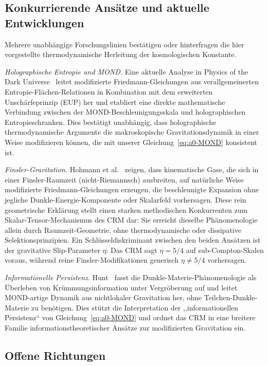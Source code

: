 \documentclass[12pt,a4paper]{article}
\theoremstyle{definition}
\theoremstyle{plain}
\theoremstyle{remark}
\begin{document}
\subsection{Konkurrierende Ans\"atze und aktuelle Entwicklungen}

Mehrere unabh\"angige Forschungslinien best\"atigen oder hinterfragen die
hier vorgestellte thermodynamische Herleitung der kosmologischen Konstante.

\emph{Holographische Entropie und MOND.}\; Eine aktuelle Analyse in Physics
of the Dark Universe~\cite{MONDEntropy2025} leitet modifizierte
Friedmann-Gleichungen aus verallgemeinerten Entropie-Fl\"achen-Relationen
in Kombination mit dem erweiterten Unsch\"arfeprinzip (EUP) her und
etabliert eine direkte mathematische Verbindung zwischen der
MOND-Beschleunigungsskala und holographischen Entropieschranken. Dies
best\"atigt unabh\"angig, dass holographische thermodynamische Argumente
die makroskopische Gravitationsdynamik in einer Weise modifizieren
k\"onnen, die mit unserer Gleichung~\eqref{eq:a0-MOND} konsistent ist.

\emph{Finsler-Gravitation.}\; Hohmann et al.~\cite{FinslerJCAP2025} zeigen,
dass kinematische Gase, die sich in einer Finsler-Raumzeit (nicht-Riemannsch)
ausbreiten, auf nat\"urliche Weise modifizierte Friedmann-Gleichungen
erzeugen, die beschleunigte Expansion ohne jegliche Dunkle-Energie-Komponente
oder Skalarfeld vorhersagen. Diese rein geometrische Erkl\"arung stellt einen
starken methodischen Konkurrenten zum Skalar-Tensor-Mechanismus des CRM dar:
Sie erreicht dieselbe Ph\"anomenologie allein durch Raumzeit-Geometrie, ohne
thermodynamische oder dissipative Selektionsprinzipien. Ein
Schl\"usseldiskriminant zwischen den beiden Ans\"atzen ist der gravitative
Slip-Parameter $\eta$: Das CRM sagt $\eta = 5/4$ auf sub-Compton-Skalen
voraus, w\"ahrend reine Finsler-Modifikationen generisch
$\eta \neq 5/4$ vorhersagen.

\emph{Informationelle Persistenz.}\; Hunt~\cite{HuntMOND2026} fasst die
Dunkle-Materie-Ph\"anomenologie als \"Uberleben von
Kr\"ummungsinformation unter Vergr\"oberung auf und leitet MOND-artige
Dynamik aus nichtlokaler Gravitation her, ohne Teilchen-Dunkle-Materie zu
ben\"otigen. Dies st\"utzt die Interpretation der ,,informationellen
Persistenz`` von Gleichung~\eqref{eq:a0-MOND} und ordnet das CRM in eine
breitere Familie informationstheoretischer Ans\"atze zur modifizierten
Gravitation ein.

\subsection{Offene Richtungen}
\end{document}
